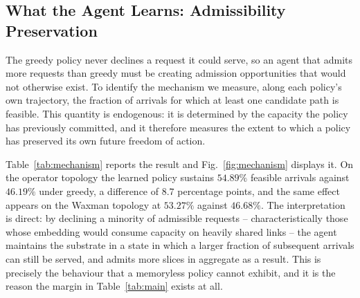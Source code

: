 \documentclass[10pt,journal,comsoc]{IEEEtran}
\begin{document}
\subsection{What the Agent Learns: Admissibility Preservation}
\label{sec:mechanism}
The greedy policy never declines a request it could serve, so an agent
that admits more requests than greedy must be creating admission
opportunities that would not otherwise exist. To identify the mechanism
we measure, along each policy's own trajectory, the fraction of arrivals
for which at least one candidate path is feasible. This quantity is
endogenous: it is determined by the capacity the policy has previously
committed, and it therefore measures the extent to which a policy has
preserved its own future freedom of action.

Table~\ref{tab:mechanism} reports the result and Fig.~\ref{fig:mechanism}
displays it. On the operator topology the learned policy sustains
$54.89\%$ feasible arrivals against $46.19\%$ under greedy, a difference
of $8.7$ percentage points, and the same effect appears on the Waxman
topology at $53.27\%$ against $46.68\%$. The interpretation is direct:
by declining a minority of admissible requests -- characteristically
those whose embedding would consume capacity on heavily shared links --
the agent maintains the substrate in a state in which a larger fraction
of subsequent arrivals can still be served, and admits more slices in
aggregate as a result. This is precisely the behaviour that a memoryless
policy cannot exhibit, and it is the reason the margin in
Table~\ref{tab:main} exists at all.
\end{document}
